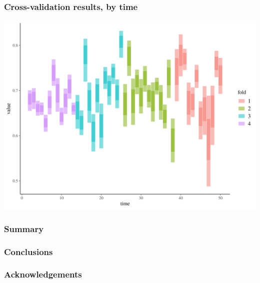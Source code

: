 \documentclass{beamer}
\begin{document}
\begin{frame}
  \frametitle{Cross-validation results, by time}

  \includegraphics[width=\textwidth,height=0.8\textheight,keepaspectratio=true]{../results/figure/fold_auc_time}

\end{frame}


\begin{frame}
  \frametitle{Summary}

\end{frame}


\begin{frame}
  \frametitle{Conclusions}

\end{frame}


\begin{frame}
  \frametitle{Acknowledgements}

\end{frame}
\end{document}
